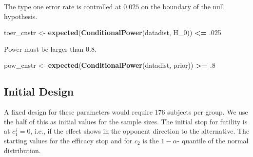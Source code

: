 \documentclass[]{book}
\newenvironment{Shaded}{\begin{snugshade}}{\end{snugshade}}
\newcommand{\DecValTok}[1]{\textcolor[rgb]{0.00,0.00,0.81}{#1}}
\newcommand{\FloatTok}[1]{\textcolor[rgb]{0.00,0.00,0.81}{#1}}
\newcommand{\KeywordTok}[1]{\textcolor[rgb]{0.13,0.29,0.53}{\textbf{#1}}}
\newcommand{\NormalTok}[1]{#1}
\newcommand{\OperatorTok}[1]{\textcolor[rgb]{0.81,0.36,0.00}{\textbf{#1}}}
\newcommand{\StringTok}[1]{\textcolor[rgb]{0.31,0.60,0.02}{#1}}
\begin{document}
The type one error rate is controlled at \(0.025\) on the boundary of the
null hypothesis.

\begin{Shaded}
\begin{Highlighting}[]
\NormalTok{toer_cnstr <-}\StringTok{ }\KeywordTok{expected}\NormalTok{(}\KeywordTok{ConditionalPower}\NormalTok{(datadist, H_}\DecValTok{0}\NormalTok{)) }\OperatorTok{<=}\StringTok{ }\FloatTok{.025}
\end{Highlighting}
\end{Shaded}

Power must be larger than \(0.8\).

\begin{Shaded}
\begin{Highlighting}[]
\NormalTok{pow_cnstr <-}\StringTok{ }\KeywordTok{expected}\NormalTok{(}\KeywordTok{ConditionalPower}\NormalTok{(datadist, prior)) }\OperatorTok{>=}\StringTok{ }\FloatTok{.8}
\end{Highlighting}
\end{Shaded}

\hypertarget{initial-design-9}{%
\subsection{Initial Design}\label{initial-design-9}}

A fixed design for these parameters would require
176
subjects per group. We use the half of this as initial values for the
sample sizes.
The initial stop for futility is at \(c_1^f=0\), i.e., if the effect shows
in the opponent direction to the alternative.
The starting values for the efficacy stop and for \(c_2\) is the \(1-\alpha\)-
quantile of the normal distribution.
\end{document}

